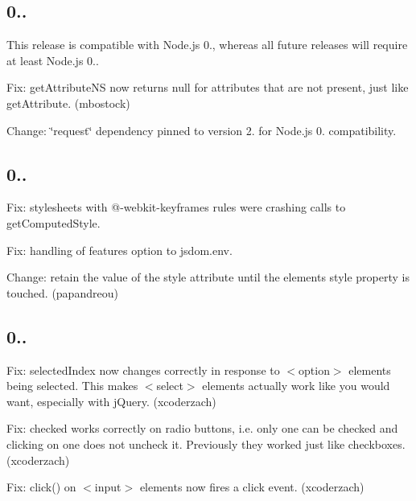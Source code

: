 \subsection*{0..}

This release is compatible with Node.\+js 0., whereas all future releases will require at least Node.\+js 0..


\begin{DoxyItemize}
\item Fix\+: {\ttfamily get\+Attribute\+NS} now returns {\ttfamily null} for attributes that are not present, just like {\ttfamily get\+Attribute}. (mbostock)
\item Change\+: {\ttfamily \char`\"{}request\char`\"{}} dependency pinned to version 2. for Node.\+js 0. compatibility.
\end{DoxyItemize}

\subsection*{0..}


\begin{DoxyItemize}
\item Fix\+: stylesheets with {\ttfamily @-\/webkit-\/keyframes} rules were crashing calls to {\ttfamily get\+Computed\+Style}.
\item Fix\+: handling of {\ttfamily features} option to {\ttfamily jsdom.\+env}.
\item Change\+: retain the value of the {\ttfamily style} attribute until the element\textquotesingle{}s {\ttfamily style} property is touched. (papandreou)
\end{DoxyItemize}

\subsection*{0..}


\begin{DoxyItemize}
\item Fix\+: {\ttfamily selected\+Index} now changes correctly in response to {\ttfamily $<$option$>$} elements being selected. This makes {\ttfamily $<$select$>$} elements actually work like you would want, especially with j\+Query. (xcoderzach)
\item Fix\+: {\ttfamily checked} works correctly on radio buttons, i.\+e. only one can be checked and clicking on one does not uncheck it. Previously they worked just like checkboxes. (xcoderzach)
\item Fix\+: {\ttfamily click()} on {\ttfamily $<$input$>$} elements now fires a click event. (xcoderzach)
\end{DoxyItemize}


